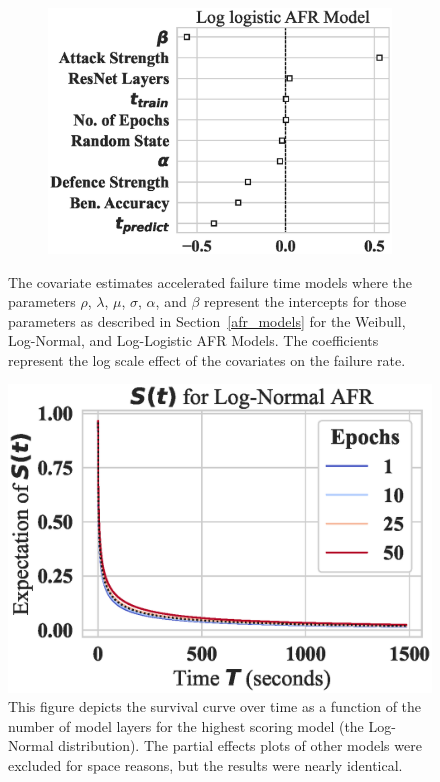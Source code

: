 \begin{figure}
\begin{subfigure}[t]{0.3\textwidth}
        \includegraphics[width=\textwidth]{mnist_log_logistic_aft.eps}
    \end{subfigure}
    
    \caption{The covariate estimates accelerated failure time models where the parameters $\rho$, $\lambda$, $\mu$, $\sigma$, $\alpha$, and $\beta$ represent the intercepts for those parameters as described in Section~\ref{afr_models} for the Weibull, Log-Normal, and Log-Logistic AFR Models. The coefficients represent the log scale effect of the covariates on the failure rate.}
    \label{fig:mnist_afr_models}
\end{figure}

\begin{figure}
    \centering\includegraphics[width=.5\textwidth]{mnist_log_normal_epochs_partial_effect.eps}
    \caption{This figure depicts the survival curve over time as a function of the number of model layers for the highest scoring model (the Log-Normal distribution). The partial effects plots of other models were excluded for space reasons, but the results were nearly identical.}
    \label{fig:mnist_layers}
\end{figure}

